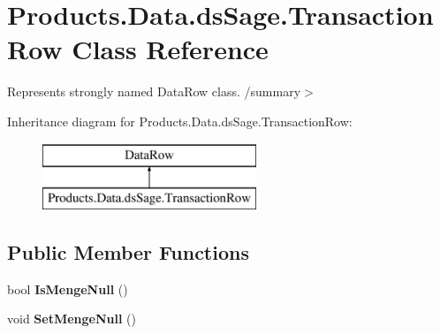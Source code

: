 \hypertarget{class_products_1_1_data_1_1ds_sage_1_1_transaction_row}{}\section{Products.\+Data.\+ds\+Sage.\+Transaction\+Row Class Reference}
\label{class_products_1_1_data_1_1ds_sage_1_1_transaction_row}


Represents strongly named Data\+Row class. /summary$>$  


Inheritance diagram for Products.\+Data.\+ds\+Sage.\+Transaction\+Row\+:\begin{figure}[H]
\begin{center}
\leavevmode
\includegraphics[height=2.000000cm]{class_products_1_1_data_1_1ds_sage_1_1_transaction_row}
\end{center}
\end{figure}
\subsection*{Public Member Functions}
\begin{DoxyCompactItemize}
\item 
bool {\bfseries Is\+Menge\+Null} ()\hypertarget{class_products_1_1_data_1_1ds_sage_1_1_transaction_row_a7ea4894a5e30987c8b2b256b44cdb878}{}\label{class_products_1_1_data_1_1ds_sage_1_1_transaction_row_a7ea4894a5e30987c8b2b256b44cdb878}

\item 
void {\bfseries Set\+Menge\+Null} ()\hypertarget{class_products_1_1_data_1_1ds_sage_1_1_transaction_row_a7efcea01b79ac81089f50616ca71b5ad}{}\label{class_products_1_1_data_1_1ds_sage_1_1_transaction_row_a7efcea01b79ac81089f50616ca71b5ad}

\end{DoxyCompactItemize}
